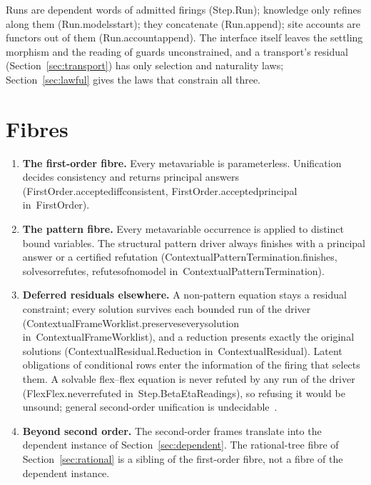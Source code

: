 \documentclass[11pt]{article}
\theoremstyle{remark}
\newcommand{\lean}[1]{{\ttfamily\def\_{\textunderscore\allowbreak}#1}}
\newcommand{\inmod}[1]{in~{\ttfamily\def\_{\textunderscore\allowbreak}#1}}
\begin{document}
Runs are dependent words of admitted firings (\lean{Step.Run}); knowledge only refines along them
(\lean{Run.models\_start}); they concatenate (\lean{Run.append}); site accounts are functors out of them
(\lean{Run.account\_append}). The interface itself leaves the settling morphism and the reading of
guards unconstrained, and a transport's residual (Section~\ref{sec:transport}) has only selection and
naturality laws; Section~\ref{sec:lawful} gives the laws that constrain all three.

\section{Fibres}\label{sec:fibres}

\begin{enumerate}
\item \textbf{The first-order fibre.} Every metavariable is parameterless. Unification decides
  consistency and returns principal answers (\lean{FirstOrder.accepted\_iff\_consistent},
  \lean{FirstOrder.accepted\_principal} \inmod{FirstOrder}).
\item \textbf{The pattern fibre.} Every metavariable occurrence is applied to distinct bound variables.
  The structural pattern driver always finishes with a principal answer or a certified refutation
  (\lean{ContextualPatternTermination.finishes}, \lean{solves\_or\_refutes}, \lean{refutes\_of\_no\_model}
  \inmod{ContextualPatternTermination}).
\item \textbf{Deferred residuals elsewhere.} A non-pattern equation stays a residual constraint; every
  solution survives each bounded run of the driver (\lean{ContextualFrameWorklist.preserves\_every\_solution} \inmod{ContextualFrameWorklist}),
  and a reduction presents exactly the original solutions (\lean{ContextualResidual.Reduction} \inmod{ContextualResidual}). Latent
  obligations of conditional rows enter the information of the firing that selects them. A solvable
  flex--flex equation is never refuted by any run of the driver (\lean{FlexFlex.never\_refuted}
  \inmod{Step.BetaEtaReadings}), so refusing it would be unsound; general second-order unification is
  undecidable~\cite{goldfarb81}.
\item \textbf{Beyond second order.} The second-order frames translate into the dependent instance of
  Section~\ref{sec:dependent}. The rational-tree fibre of Section~\ref{sec:rational} is a sibling of
  the first-order fibre, not a fibre of the dependent instance.
\end{enumerate}
\end{document}
